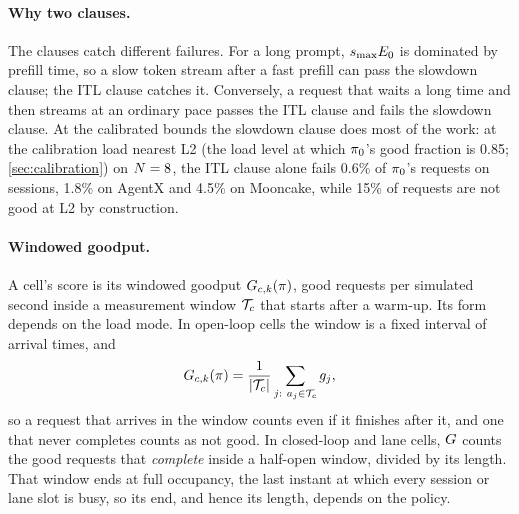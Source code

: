 \paragraph{Why two clauses.}
The clauses catch different failures. For a long prompt, $s_{\max}E_0$ is dominated by prefill
time, so a slow token stream after a fast prefill can pass the slowdown clause; the ITL clause
catches it. Conversely, a request that waits a long time and then streams at an ordinary pace
passes the ITL clause and fails the slowdown clause. At the calibrated bounds the slowdown clause
does most of the work: at the calibration load nearest L2 (the load level at which $\pi_{0}$'s good
fraction is 0.85; \cref{sec:calibration}) on $N = 8$, the ITL clause alone fails
0.6\% of $\pi_{0}$'s requests on sessions, 1.8\% on AgentX and 4.5\% on Mooncake, while 15\% of
requests are not good at L2 by construction.

\paragraph{Windowed goodput.}
A cell's score is its windowed goodput $G_{c,k}(\pi)$, good requests per simulated
second inside a measurement window $\mathcal{T}_{c}$ that starts after a warm-up. Its form depends on
the load mode. In open-loop cells the window is a fixed interval of arrival times, and
\begin{equation}
  \label{eq:goodput-open}
  G_{c,k}(\pi) = \frac{1}{|\mathcal{T}_{c}|}\sum_{j:\ a_j \in \mathcal{T}_{c}} g_j ,
\end{equation}
so a request that arrives in the window counts even if it finishes after it, and one that never
completes counts as not good. In closed-loop and lane cells, $G$ counts the good requests that
\emph{complete} inside a half-open window, divided by its length. That window ends at full
occupancy, the last instant at which every session or lane slot is busy, so its end, and hence
its length, depends on the policy.


